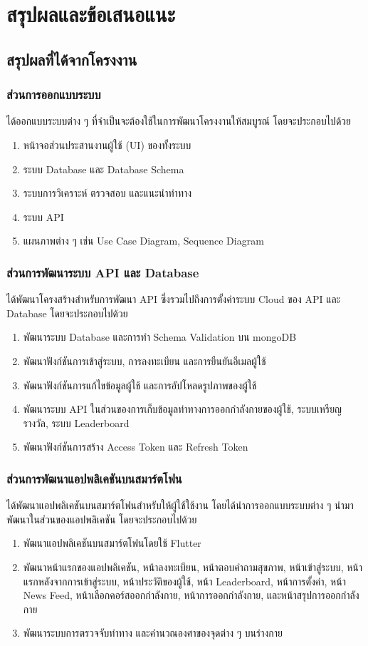 \chapter{สรุปผลและข้อเสนอแนะ}
\section{สรุปผลที่ได้จากโครงงาน}
\subsection{ส่วนการออกแบบระบบ}
ได้ออกแบบระบบต่าง ๆ ที่จำเป็นจะต้องใช้ในการพัฒนาโครงงานให้สมบูรณ์ โดยจะประกอบไปด้วย
\begin{enumerate}
    \item หน้าจอส่วนประสานงานผู้ใช้ (UI) ของทั้งระบบ
    \item ระบบ Database และ Database Schema
    \item ระบบการวิเคราะห์ ตรวจสอบ และแนะนำท่าทาง
    \item ระบบ API
    \item แผนภาพต่าง ๆ เช่น Use Case Diagram, Sequence Diagram
\end{enumerate}

\subsection{ส่วนการพัฒนาระบบ API และ Database}
ได้พัฒนาโครงสร้างสำหรับการพัฒนา API ซึ่งรวมไปถึงการตั้งค่าระบบ Cloud ของ API และ Database โดยจะประกอบไปด้วย
\begin{enumerate}
    \item พัฒนาระบบ Database และการทำ Schema Validation บน mongoDB
    \item พัฒนาฟังก์ชันการเข้าสู่ระบบ, การลงทะเบียน และการยืนยันอีเมลผู้ใช้
    \item พัฒนาฟังก์ชันการแก้ไขข้อมูลผู้ใช้ และการอัปโหลดรูปภาพของผู้ใช้
    \item พัฒนาระบบ API ในส่วนของการเก็บข้อมูลท่าทางการออกกำลังกายของผู้ใช้, ระบบเหรียญรางวัล, ระบบ Leaderboard
    \item พัฒนาฟังก์ชันการสร้าง Access Token และ Refresh Token
\end{enumerate}

\subsection{ส่วนการพัฒนาแอปพลิเคชันบนสมาร์ตโฟน}
ได้พัฒนาแอปพลิเคชันบนสมาร์ตโฟนสำหรับให้ผู้ใช้ใช้งาน โดยได้นำการออกแบบระบบต่าง ๆ นำมาพัฒนาในส่วนของแอปพลิเคชัน โดยจะประกอบไปด้วย
\begin{enumerate}
    \item พัฒนาแอปพลิเคชันบนสมาร์ตโฟนโดยใช้ Flutter
    \item พัฒนาหน้าแรกของแอปพลิเคชัน, หน้าลงทะเบียน, หน้าตอบคำถามสุขภาพ, หน้าเข้าสู่ระบบ, หน้าแรกหลังจากการเข้าสู่ระบบ, หน้าประวัติของผู้ใช้, หน้า Leaderboard, หน้าการตั้งค่า, หน้า News Feed, หน้าเลือกคอร์สออกกำลังกาย, หน้าการออกกำลังกาย, และหน้าสรุปการออกกำลังกาย
    \item พัฒนาระบบการตรวจจับท่าทาง และคำนวณองศาของจุดต่าง ๆ บนร่างกาย
\end{enumerate}


